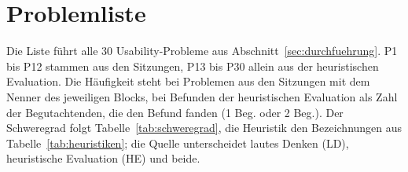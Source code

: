 \chapter{Problemliste}
\label{anh:problemliste}

Die Liste führt alle 30 Usability-Probleme aus Abschnitt~\ref{sec:durchfuehrung}. P1 bis P12 stammen aus den Sitzungen, P13 bis P30 allein aus der heuristischen Evaluation. Die Häufigkeit steht bei Problemen aus den Sitzungen mit dem Nenner des jeweiligen Blocks, bei Befunden der heuristischen Evaluation als Zahl der Begutachtenden, die den Befund fanden (1 Beg. oder 2 Beg.). Der Schweregrad folgt Tabelle~\ref{tab:schweregrad}, die Heuristik den Bezeichnungen aus Tabelle~\ref{tab:heuristiken}; die Quelle unterscheidet lautes Denken (LD), heuristische Evaluation (HE) und beide.

